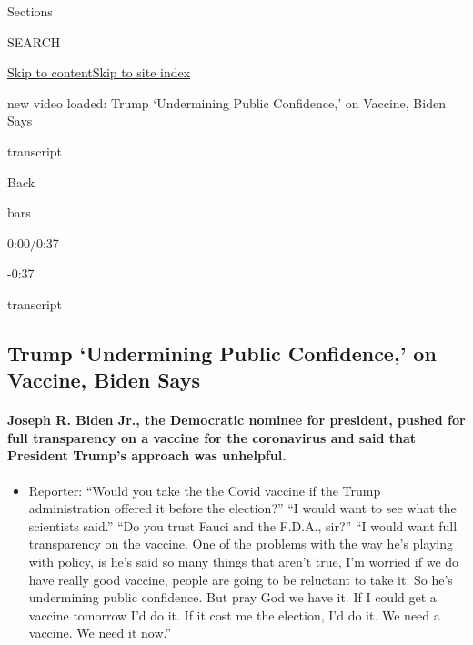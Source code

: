 Sections

SEARCH

\protect\hyperlink{site-content}{Skip to
content}\protect\hyperlink{site-index}{Skip to site index}

new video loaded: Trump `Undermining Public Confidence,' on Vaccine,
Biden Says

transcript

Back

bars

0:00/0:37

-0:37

transcript

\hypertarget{trump-undermining-public-confidence-on-vaccine-biden-says}{%
\subsection{Trump `Undermining Public Confidence,' on Vaccine, Biden
Says}\label{trump-undermining-public-confidence-on-vaccine-biden-says}}

\hypertarget{joseph-r-biden-jr-the-democratic-nominee-for-president-pushed-for-full-transparency-on-a-vaccine-for-the-coronavirus-and-said-that-president-trumps-approach-was-unhelpful}{%
\paragraph{Joseph R. Biden Jr., the Democratic nominee for president,
pushed for full transparency on a vaccine for the coronavirus and said
that President Trump's approach was
unhelpful.}\label{joseph-r-biden-jr-the-democratic-nominee-for-president-pushed-for-full-transparency-on-a-vaccine-for-the-coronavirus-and-said-that-president-trumps-approach-was-unhelpful}}

\begin{itemize}
\tightlist
\item
  Reporter: ``Would you take the the Covid vaccine if the Trump
  administration offered it before the election?'' ``I would want to see
  what the scientists said.'' ``Do you trust Fauci and the F.D.A.,
  sir?'' ``I would want full transparency on the vaccine. One of the
  problems with the way he's playing with policy, is he's said so many
  things that aren't true, I'm worried if we do have really good
  vaccine, people are going to be reluctant to take it. So he's
  undermining public confidence. But pray God we have it. If I could get
  a vaccine tomorrow I'd do it. If it cost me the election, I'd do it.
  We need a vaccine. We need it now.''
\end{itemize}

